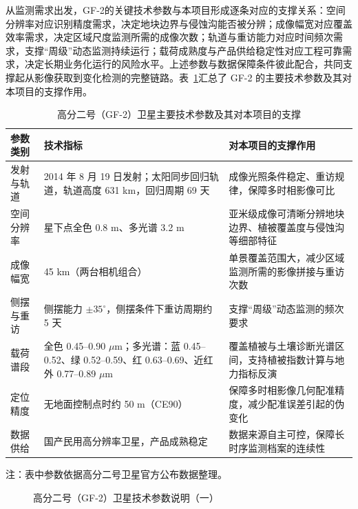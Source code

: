 从监测需求出发，GF-2的关键技术参数与本项目形成逐条对应的支撑关系：空间分辨率对应识别精度需求，决定地块边界与侵蚀沟能否被分辨；成像幅宽对应覆盖效率需求，决定区域尺度监测所需的成像次数；轨道与重访能力对应时间频次需求，支撑“周级”动态监测持续运行；载荷成熟度与产品供给稳定性对应工程可靠需求，决定长期业务化运行的风险水平。上述参数与数据保障条件彼此配合，共同支撑起从影像获取到变化检测的完整链路。表~\ref{tab:gf2}汇总了 GF-2 的主要技术参数及其对本项目的支撑作用。

\begin{table}[htbp]
    \centering
    \caption{高分二号（GF-2）卫星主要技术参数及其对本项目的支撑}
    \label{tab:gf2}
    \small
    \begin{tabular}{|p{2.6cm}|p{5.6cm}|p{5.8cm}|}
        \hline
        \textbf{参数类别} & \textbf{技术指标} & \textbf{对本项目的支撑作用} \\
        \hline
        发射与轨道 & 2014 年 8 月 19 日发射；太阳同步回归轨道，轨道高度 631 km，回归周期 69 天 & 成像光照条件稳定、重访规律，保障多时相影像可比 \\
        \hline
        空间分辨率 & 星下点全色 0.8 m、多光谱 3.2 m & 亚米级成像可清晰分辨地块边界、植被覆盖度与侵蚀沟等细部特征 \\
        \hline
        成像幅宽 & 45 km（两台相机组合） & 单景覆盖范围大，减少区域监测所需的影像拼接与重访次数 \\
        \hline
        侧摆与重访 & 侧摆能力 $\pm35^\circ$，侧摆条件下重访周期约 5 天 & 支撑“周级”动态监测的频次要求 \\
        \hline
        载荷谱段 & 全色 0.45--0.90 $\mu$m；多光谱：蓝 0.45--0.52、绿 0.52--0.59、红 0.63--0.69、近红外 0.77--0.89 $\mu$m & 覆盖植被与土壤诊断光谱区间，支持植被指数计算与地力指标反演 \\
        \hline
        定位精度 & 无地面控制点时约 50 m（CE90） & 保障多时相影像几何配准精度，减少配准误差引起的伪变化 \\
        \hline
        数据供给 & 国产民用高分辨率卫星，产品成熟稳定 & 数据来源自主可控，保障长时序监测档案的连续性 \\
        \hline
    \end{tabular}
    \par\vspace{2pt}
    {\footnotesize 注：表中参数依据高分二号卫星官方公布数据整理。}
\end{table}

\begin{figure}[htbp]
    \centering
    \caption{高分二号（GF-2）卫星技术参数说明（一）}
    \label{fig:4a}
\end{figure}

